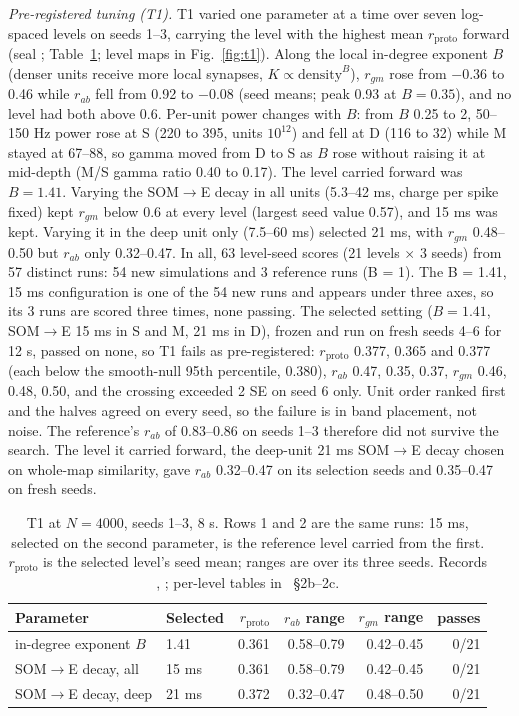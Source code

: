 \textit{Pre-registered tuning (T1).} T1 varied one parameter at a time over seven log-spaced levels on seeds 1--3,
carrying the level with the highest mean $r_\text{proto}$ forward (seal ; Table~\ref{tab:t1}; level maps in Fig.~\ref{fig:t1}). Along the
local in-degree exponent $B$ (denser units receive more local synapses, $K \propto \text{density}^B$), $r_{gm}$
rose from $-0.36$ to 0.46 while $r_{ab}$ fell from 0.92 to $-0.08$ (seed means; peak 0.93 at $B = 0.35$), and no
level had both above 0.6. Per-unit power changes with $B$: from $B$ 0.25 to 2, 50--150 Hz power rose at S (220 to 395,
units $10^{12}$) and fell at D (116 to 32) while M stayed at 67--88, so gamma moved from D to S as $B$ rose
without raising it at mid-depth (M/S gamma ratio 0.40 to 0.17). The level carried forward was $B = 1.41$. Varying
the SOM$\to$E decay in all units (5.3--42 ms, charge per spike fixed) kept $r_{gm}$ below 0.6 at every level
(largest seed value 0.57), and 15 ms was kept. Varying it in the deep unit only (7.5--60 ms) selected 21 ms, with
$r_{gm}$ 0.48--0.50 but $r_{ab}$ only 0.32--0.47. In all, 63 level-seed scores (21 levels $\times$ 3 seeds) from 57 distinct runs: 54 new simulations and 3 reference runs (B = 1). The B = 1.41, 15 ms configuration is one of the 54 new runs and appears under three axes, so its 3 runs are scored three times, none
passing. The selected setting ($B = 1.41$, SOM$\to$E 15 ms in S and M, 21 ms in D), frozen and run on fresh seeds
4--6 for 12 s, passed on none, so T1 fails as pre-registered: $r_\text{proto}$ 0.377, 0.365 and 0.377 (each below
the smooth-null 95th percentile, 0.380), $r_{ab}$ 0.47, 0.35, 0.37, $r_{gm}$ 0.46, 0.48, 0.50, and the crossing
exceeded 2 SE on seed 6 only. Unit order ranked first and the halves agreed on every seed, so the failure is in
band placement, not noise. The reference's $r_{ab}$ of 0.83--0.86 on seeds 1--3 therefore did not survive the search.
The level it carried forward, the deep-unit 21 ms SOM$\to$E decay chosen on whole-map similarity, gave $r_{ab}$
0.32--0.47 on its selection seeds and 0.35--0.47 on fresh seeds.

\begin{table}[tbp]
\centering
\small
\begin{tabular}{llrrrr}
\toprule
Parameter & Selected & $r_\text{proto}$ & $r_{ab}$ range & $r_{gm}$ range & passes \\
\midrule
in-degree exponent $B$ & 1.41 & 0.361 & 0.58--0.79 & 0.42--0.45 & 0/21 \\
SOM$\to$E decay, all & 15 ms & 0.361 & 0.58--0.79 & 0.42--0.45 & 0/21 \\
SOM$\to$E decay, deep & 21 ms & 0.372 & 0.32--0.47 & 0.48--0.50 & 0/21 \\
\bottomrule
\end{tabular}
\caption{T1 at $N = 4000$, seeds 1--3, 8 s. Rows 1 and 2 are the same runs: 15 ms, selected on the second
parameter, is the reference level carried from the first. $r_\text{proto}$ is the selected level's seed mean;
ranges are over its three seeds. Records , ; per-level tables in ~\S2b--2c.}
\label{tab:t1}
\end{table}

